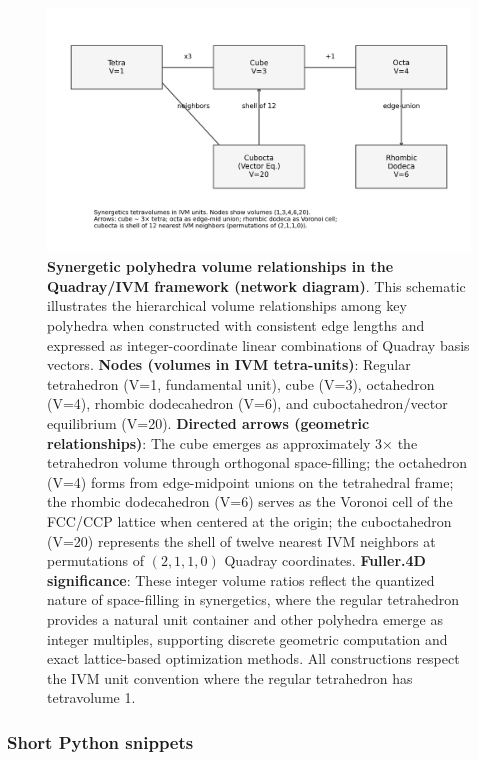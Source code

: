 \documentclass[
  10pt,
]{article}
\begin{document}
\begin{figure}
\centering
\includegraphics{../output/figures/polyhedra_quadray_constructions.png}
\caption{\textbf{Synergetic polyhedra volume relationships in the
Quadray/IVM framework (network diagram)}. This schematic illustrates the
hierarchical volume relationships among key polyhedra when constructed
with consistent edge lengths and expressed as integer-coordinate linear
combinations of Quadray basis vectors. \textbf{Nodes (volumes in IVM
tetra-units)}: Regular tetrahedron (V=1, fundamental unit), cube (V=3),
octahedron (V=4), rhombic dodecahedron (V=6), and cuboctahedron/vector
equilibrium (V=20). \textbf{Directed arrows (geometric relationships)}:
The cube emerges as approximately 3× the tetrahedron volume through
orthogonal space-filling; the octahedron (V=4) forms from edge-midpoint
unions on the tetrahedral frame; the rhombic dodecahedron (V=6) serves
as the Voronoi cell of the FCC/CCP lattice when centered at the origin;
the cuboctahedron (V=20) represents the shell of twelve nearest IVM
neighbors at permutations of \((2,1,1,0)\) Quadray coordinates.
\textbf{Fuller.4D significance}: These integer volume ratios reflect the
quantized nature of space-filling in synergetics, where the regular
tetrahedron provides a natural unit container and other polyhedra emerge
as integer multiples, supporting discrete geometric computation and
exact lattice-based optimization methods. All constructions respect the
IVM unit convention where the regular tetrahedron has tetravolume 1.}
\end{figure}

\hypertarget{short-python-snippets}{%
\subsubsection{Short Python snippets}\label{short-python-snippets}}
\end{document}
